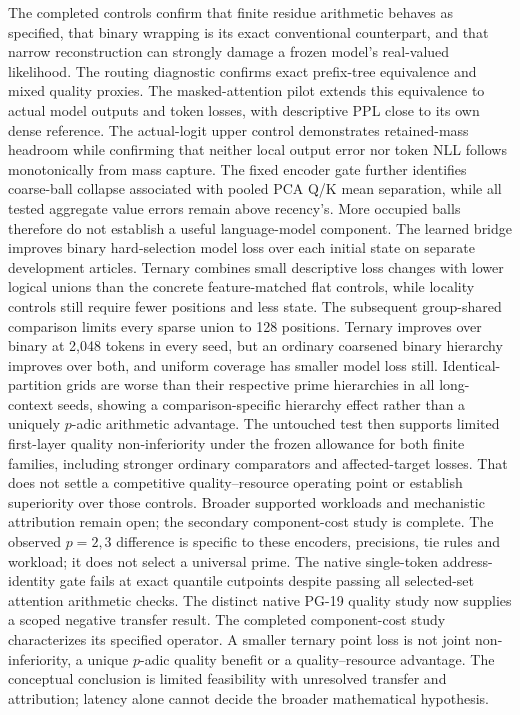 \documentclass[11pt]{article}
\begin{document}
The completed controls confirm that finite residue arithmetic behaves as
specified, that binary wrapping is its exact conventional counterpart, and
that narrow reconstruction can strongly damage a frozen model's real-valued
likelihood. The routing diagnostic confirms exact prefix-tree equivalence and mixed quality
proxies. The masked-attention pilot extends this equivalence to actual model
outputs and token losses, with descriptive PPL close to its own dense reference.
The actual-logit upper control demonstrates retained-mass headroom while
confirming that neither local output error nor token NLL follows monotonically
from mass capture.
The fixed encoder gate further identifies coarse-ball collapse associated
with pooled PCA Q/K mean separation, while all tested aggregate value errors
remain above recency's. More occupied balls therefore do not establish a useful
language-model component.
The learned bridge improves binary hard-selection model loss over each initial
state on separate development articles. Ternary combines small descriptive
loss changes with lower logical unions than the concrete feature-matched flat
controls, while locality controls still require fewer positions and less state.
The subsequent group-shared comparison limits every sparse union to 128
positions. Ternary improves over binary at 2,048 tokens in every seed, but
an ordinary coarsened binary hierarchy improves over both, and uniform
coverage has smaller model loss still. Identical-partition grids are worse
than their respective prime hierarchies in all long-context seeds, showing
a comparison-specific hierarchy effect rather than a uniquely \(p\)-adic
arithmetic advantage. The untouched test then supports limited first-layer
quality non-inferiority under the frozen allowance for both finite families,
including stronger ordinary comparators and affected-target losses. That
does not settle a competitive quality--resource operating point or establish
superiority over those controls. Broader supported workloads and mechanistic
attribution remain open; the secondary component-cost study is complete.
The observed \(p=2,3\) difference is specific to these encoders, precisions,
tie rules and workload; it does not select a universal prime.
The native single-token address-identity gate fails at exact quantile
cutpoints despite passing all selected-set attention arithmetic checks.
The distinct native PG-19 quality study now supplies a scoped negative
transfer result. The completed component-cost study characterizes its specified operator.
A smaller ternary point loss is not joint non-inferiority, a unique
\(p\)-adic quality benefit or a quality--resource advantage. The conceptual
conclusion is limited feasibility with unresolved transfer and attribution;
latency alone cannot decide the broader mathematical hypothesis.
\end{document}
